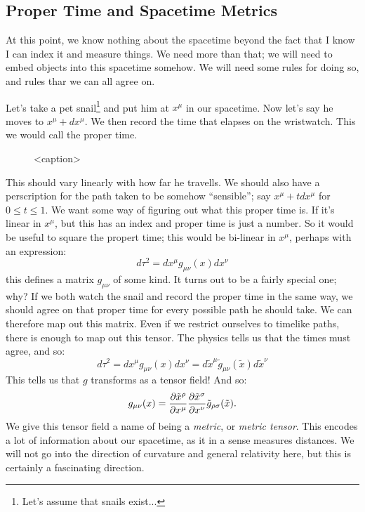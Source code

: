 \subsection{Proper Time and Spacetime Metrics}
At this point, we know nothing about the spacetime beyond the fact that I know I can index it and measure things. We need more than that; we will need to embed objects into this spacetime somehow. We will need some rules for doing so, and rules thar we can all agree on.

Let's take a pet snail\footnote{Let's assume that snails exist...} and put him at $x^\mu$ in our spacetime. Now let's say he moves to $x^\mu + dx^\mu$. We then record the time that elapses on the wristwatch. This we would call the proper time. 

\begin{figure}[htbp]
    \centering
    
    \caption{<caption>}
    \label{<label>}
\end{figure}

This should vary linearly with how far he travells. We should also have a perscription for the path taken to be somehow ``sensible''; say $x^\mu + tdx^\mu$ for $0 \leq t \leq 1$. We want some way of figuring out what this proper time is. If it's linear in $x^\mu$, but this has an index and proper time is just a number. So it would be useful to square the propert time; this would be bi-linear in $x^\mu$, perhaps with an expression:
\begin{equation}
    d\tau^2 = dx^\mu g_{\mu\nu}(x)dx^\nu
\end{equation}
this defines a matrix $g_{\mu\nu}$ of some kind. It turns out to be a fairly special one; why? If we both watch the snail and record the proper time in the same way, we should agree on that proper time for every possible path he should take. We can therefore map out this matrix. Even if we restrict ourselves to timelike paths, there is enough to map out this tensor. The physics tells us that the times must agree, and so:
\begin{equation}\label{eq-dtau2WC}
    d\tau^2 = dx^\mu g_{\mu\nu}(x)dx^\nu = d\tilde{x}^\mu \tilde{g}_{\mu\nu}(\tilde{x})d\tilde{x}^\nu
\end{equation}
This tells us that $g$ transforms as a tensor field! And so:
\begin{equation}
    g_{\mu\nu}(x) = \frac{\partial \tilde{x}^\rho}{\partial x^\mu}\frac{\partial \tilde{x}^\sigma}{\partial x^\nu}\tilde{g}_{\rho\sigma}(\tilde{x}).
\end{equation}
We give this tensor field a name of being a \emph{metric}, or \emph{metric tensor}. This encodes a lot of information about our spacetime, as it in a sense measures distances. We will not go into the direction of curvature and general relativity here, but this is certainly a fascinating direction. 

